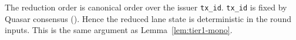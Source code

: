 \begin{remark}
The reduction order is canonical order over the issuer \texttt{tx\_id}.
\texttt{tx\_id} is fixed by Quasar consensus
(\cite{quasar2025,lp135-quasarstm-4}). Hence the reduced lane state is
deterministic in the round inputs. This is the same argument as
Lemma~\ref{lem:tier1-mono}.
\end{remark}

